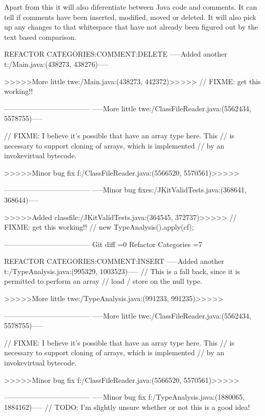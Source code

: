 Apart from this it will also diferentiate between Java code and comments.  It can tell if comments have been inserted, modified, moved or deleted.  It will also pick up any changes to that whitespace that have not already been figured out by the text based comparison.  

 
% 


REFACTOR CATEGORIES:COMMENT:DELETE
-----Added another t:/Main.java:(438273, 438276)-----
				
>>>>>More little twe:/Main.java:(438273, 442372)>>>>>
				// FIXME: get this working!!
				
------------------------------------
-----More little twe:/ClassFileReader.java:(5562434, 5578755)-----
 
			// FIXME: I believe it's possible that have an array type here. This
			// is necessary to support cloning of arrays, which is implemented
			// by an invokevirtual bytecode.
			
>>>>>Minor bug fix f:/ClassFileReader.java:(5566520, 5570561)>>>>>

	
------------------------------------
-----Minor bug fixes:/JKitValidTests.java:(368641, 368644)-----
				
>>>>>Added classfile:/JKitValidTests.java:(364545, 372737)>>>>>
				// FIXME: get this working!!
				// new TypeAnalysis().apply(cf);
	
------------------------------------
Git diff =0  Refactor Categories =7

REFACTOR CATEGORIES:COMMENT:INSERT
-----Added another t:/TypeAnalysis.java:(995329, 1003523)-----
			// This is a fall back, since it is permitted to perform an array
			// load / store on the null type.
			
>>>>>More little twe:/TypeAnalysis.java:(991233, 991235)>>>>>
			
------------------------------------
-----More little twe:/ClassFileReader.java:(5562434, 5578755)-----
 
			// FIXME: I believe it's possible that have an array type here. This
			// is necessary to support cloning of arrays, which is implemented
			// by an invokevirtual bytecode.
			
>>>>>Minor bug fix f:/ClassFileReader.java:(5566520, 5570561)>>>>>

	
------------------------------------
-----Minor bug fix f:/TypeAnalysis.java:(1880065, 1884162)-----
		// TODO: I'm slightly unsure whether or not this is a good idea!
		
